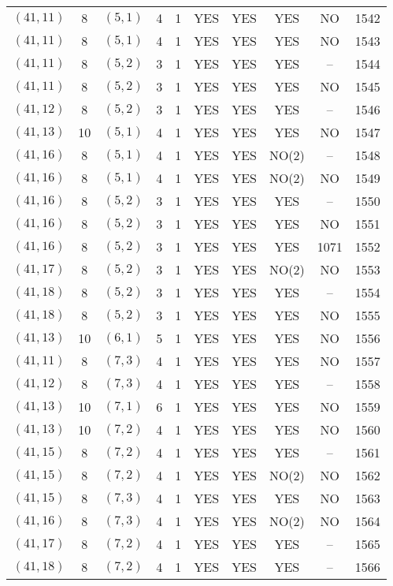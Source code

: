 \begin{longtable}{|c|c|c|c|c|c|c|c|c|c|}
$(41, 11)$ & 8 & $(5, 1)$ & 4 & 1 & YES & YES & YES & NO & 1542\\
$(41, 11)$ & 8 & $(5, 1)$ & 4 & 1 & YES & YES & YES & NO & 1543\\
$(41, 11)$ & 8 & $(5, 2)$ & 3 & 1 & YES & YES & YES & -- & 1544\\
$(41, 11)$ & 8 & $(5, 2)$ & 3 & 1 & YES & YES & YES & NO & 1545\\
$(41, 12)$ & 8 & $(5, 2)$ & 3 & 1 & YES & YES & YES & -- & 1546\\
$(41, 13)$ & 10 & $(5, 1)$ & 4 & 1 & YES & YES & YES & NO & 1547\\
$(41, 16)$ & 8 & $(5, 1)$ & 4 & 1 & YES & YES & NO(2) & -- & 1548\\
$(41, 16)$ & 8 & $(5, 1)$ & 4 & 1 & YES & YES & NO(2) & NO & 1549\\
$(41, 16)$ & 8 & $(5, 2)$ & 3 & 1 & YES & YES & YES & -- & 1550\\
$(41, 16)$ & 8 & $(5, 2)$ & 3 & 1 & YES & YES & YES & NO & 1551\\
$(41, 16)$ & 8 & $(5, 2)$ & 3 & 1 & YES & YES & YES & 1071 & 1552\\
$(41, 17)$ & 8 & $(5, 2)$ & 3 & 1 & YES & YES & NO(2) & NO & 1553\\
$(41, 18)$ & 8 & $(5, 2)$ & 3 & 1 & YES & YES & YES & -- & 1554\\
$(41, 18)$ & 8 & $(5, 2)$ & 3 & 1 & YES & YES & YES & NO & 1555\\
$(41, 13)$ & 10 & $(6, 1)$ & 5 & 1 & YES & YES & YES & NO & 1556\\
$(41, 11)$ & 8 & $(7, 3)$ & 4 & 1 & YES & YES & YES & NO & 1557\\
$(41, 12)$ & 8 & $(7, 3)$ & 4 & 1 & YES & YES & YES & -- & 1558\\
$(41, 13)$ & 10 & $(7, 1)$ & 6 & 1 & YES & YES & YES & NO & 1559\\
$(41, 13)$ & 10 & $(7, 2)$ & 4 & 1 & YES & YES & YES & NO & 1560\\
$(41, 15)$ & 8 & $(7, 2)$ & 4 & 1 & YES & YES & YES & -- & 1561\\
$(41, 15)$ & 8 & $(7, 2)$ & 4 & 1 & YES & YES & NO(2) & NO & 1562\\
$(41, 15)$ & 8 & $(7, 3)$ & 4 & 1 & YES & YES & YES & NO & 1563\\
$(41, 16)$ & 8 & $(7, 3)$ & 4 & 1 & YES & YES & NO(2) & NO & 1564\\
$(41, 17)$ & 8 & $(7, 2)$ & 4 & 1 & YES & YES & YES & -- & 1565\\
$(41, 18)$ & 8 & $(7, 2)$ & 4 & 1 & YES & YES & YES & -- & 1566\\

\end{longtable}
